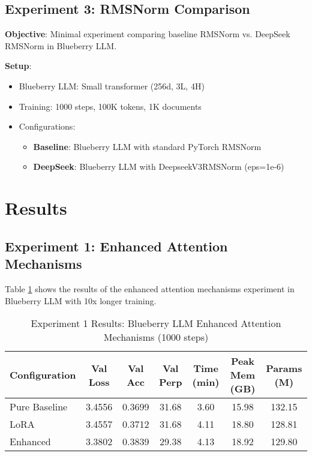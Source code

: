 \documentclass[11pt,a4paper]{article}
\begin{document}
\subsection{Experiment 3: RMSNorm Comparison}

\textbf{Objective}: Minimal experiment comparing baseline RMSNorm vs. DeepSeek RMSNorm in Blueberry LLM.

\textbf{Setup}:
\begin{itemize}
    \item Blueberry LLM: Small transformer (256d, 3L, 4H)
    \item Training: 1000 steps, 100K tokens, 1K documents
    \item Configurations:
    \begin{itemize}
        \item \textbf{Baseline}: Blueberry LLM with standard PyTorch RMSNorm
        \item \textbf{DeepSeek}: Blueberry LLM with DeepseekV3RMSNorm (eps=1e-6)
    \end{itemize}
\end{itemize}

\section{Results}

\subsection{Experiment 1: Enhanced Attention Mechanisms}

Table \ref{tab:exp1_results} shows the results of the enhanced attention mechanisms experiment in Blueberry LLM with 10x longer training.

\begin{table}[H]
\centering
\caption{Experiment 1 Results: Blueberry LLM Enhanced Attention Mechanisms (1000 steps)}
\label{tab:exp1_results}
\begin{tabular}{@{}lcccccc@{}}
\toprule
Configuration & Val Loss & Val Acc & Val Perp & Time (min) & Peak Mem (GB) & Params (M) \\
\midrule
Pure Baseline & 3.4556 & 0.3699 & 31.68 & 3.60 & 15.98 & 132.15 \\
LoRA & 3.4557 & 0.3712 & 31.68 & 4.11 & 18.80 & 128.81 \\
Enhanced & 3.3802 & 0.3839 & 29.38 & 4.13 & 18.92 & 129.80 \\
\bottomrule
\end{tabular}
\end{table}
\end{document}
